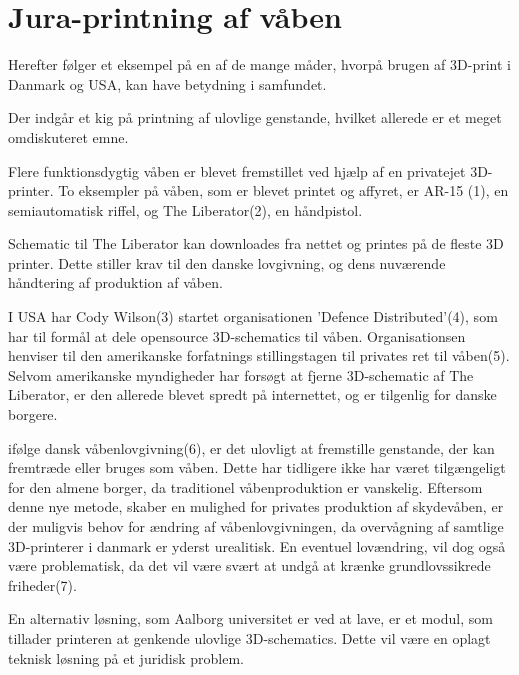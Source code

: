 \chapter{Jura-printning af våben}
Herefter følger et eksempel på en af de mange måder, hvorpå brugen af 3D-print i Danmark og USA, kan have betydning i samfundet. 

Der indgår et kig på printning af ulovlige genstande, hvilket allerede er et meget omdiskuteret emne. 

Flere funktionsdygtig våben er blevet fremstillet ved hjælp af en privatejet 3D-printer. To eksempler på våben, som er blevet printet og affyret, er AR-15 (1), en semiautomatisk riffel, og The Liberator(2), en håndpistol. 

Schematic til The Liberator kan downloades fra nettet og printes på de fleste 3D printer. Dette stiller krav til den danske lovgivning, og dens nuværende håndtering af produktion af våben.

I USA har Cody Wilson(3) startet organisationen 'Defence Distributed'(4), som har til formål at dele opensource 3D-schematics til våben. Organisationsen henviser til den amerikanske forfatnings stillingstagen til privates ret til våben(5). Selvom amerikanske myndigheder har forsøgt at fjerne 3D-schematic af The Liberator, er den allerede blevet spredt på internettet, og er tilgenlig for danske borgere.

ifølge dansk våbenlovgivning(6), er det ulovligt at fremstille genstande, der kan fremtræde eller bruges som våben. Dette har tidligere ikke har været tilgængeligt for den almene borger, da traditionel våbenproduktion er vanskelig. Eftersom denne nye metode, skaber en mulighed for privates produktion af skydevåben, er der muligvis behov for ændring af våbenlovgivningen, da overvågning af samtlige 3D-printerer i danmark er yderst urealitisk. En eventuel lovændring, vil dog også være problematisk, da det vil være svært at undgå at krænke grundlovssikrede friheder(7).

En alternativ løsning, som Aalborg universitet er ved at lave, er et modul, som tillader printeren at genkende ulovlige 3D-schematics. Dette vil være en oplagt teknisk løsning på et juridisk problem.
